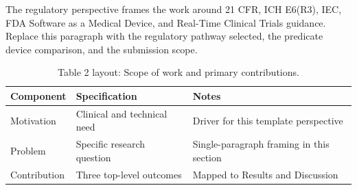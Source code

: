 
The regulatory perspective frames the work around 21 CFR, ICH E6(R3), IEC, FDA Software as a Medical Device, and Real-Time Clinical Trials guidance. Replace this paragraph with the regulatory pathway selected, the predicate device comparison, and the submission scope.

\begin{table}[H]
\caption{Table 2 layout: Scope of work and primary contributions.}
\label{tab:intro_overview}
\centering
\begin{tabular}{>{\raggedright\arraybackslash}p{3.4cm} >{\raggedright\arraybackslash}p{4.6cm} >{\raggedright\arraybackslash}p{5.4cm}}
\toprule
\textbf{Component} & \textbf{Specification} & \textbf{Notes} \\
\midrule
  Motivation & Clinical and technical need & Driver for this template perspective \\
  Problem & Specific research question & Single-paragraph framing in this section \\
  Contribution & Three top-level outcomes & Mapped to Results and Discussion \\
\bottomrule
\end{tabular}
\end{table}
